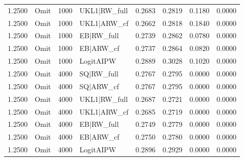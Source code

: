 \begin{tabular}{rlrlrrrr}
1.2500 & Omit & 1000 & UKL1|RW\_full & 0.2683 & 0.2819 & 0.1180 & 0.0000 \\
1.2500 & Omit & 1000 & UKL1|ARW\_cf & 0.2662 & 0.2818 & 0.1840 & 0.0000 \\
1.2500 & Omit & 1000 & EB|RW\_full & 0.2739 & 0.2862 & 0.0780 & 0.0000 \\
1.2500 & Omit & 1000 & EB|ARW\_cf & 0.2737 & 0.2864 & 0.0820 & 0.0000 \\
1.2500 & Omit & 1000 & LogitAIPW & 0.2889 & 0.3028 & 0.1020 & 0.0000 \\
1.2500 & Omit & 4000 & SQ|RW\_full & 0.2767 & 0.2795 & 0.0000 & 0.0000 \\
1.2500 & Omit & 4000 & SQ|ARW\_cf & 0.2767 & 0.2795 & 0.0000 & 0.0000 \\
1.2500 & Omit & 4000 & UKL1|RW\_full & 0.2687 & 0.2721 & 0.0000 & 0.0000 \\
1.2500 & Omit & 4000 & UKL1|ARW\_cf & 0.2685 & 0.2719 & 0.0000 & 0.0000 \\
1.2500 & Omit & 4000 & EB|RW\_full & 0.2749 & 0.2779 & 0.0000 & 0.0000 \\
1.2500 & Omit & 4000 & EB|ARW\_cf & 0.2750 & 0.2780 & 0.0000 & 0.0000 \\
1.2500 & Omit & 4000 & LogitAIPW & 0.2896 & 0.2929 & 0.0000 & 0.0000 \\
\bottomrule
\end{tabular}
